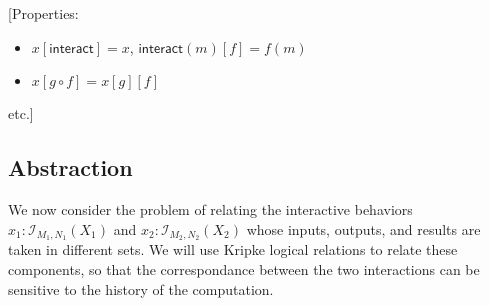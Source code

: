 \documentclass{article}
\newcommand{\kw}[1]{\ensuremath{ \mathsf{#1} }}
\begin{document}
[Properties:
\begin{itemize}
\item $x[\kw{interact}] = x$, $\kw{interact}(m)[f] = f(m)$
\item $x[g \circ f] = x[g][f]$
\end{itemize}
etc.]


\subsection{Abstraction} \label{sec:monad:abs} %

We now consider the problem of relating the interactive behaviors
$x_1 : \mathcal{I}_{M_1,N_1}(X_1)$ and
$x_2 : \mathcal{I}_{M_2,N_2}(X_2)$
whose inputs, outputs, and results are taken in different sets.
We will use Kripke logical relations to relate these components,
so that the correspondance between the two interactions
can be sensitive to the history of the computation.
\end{document}
